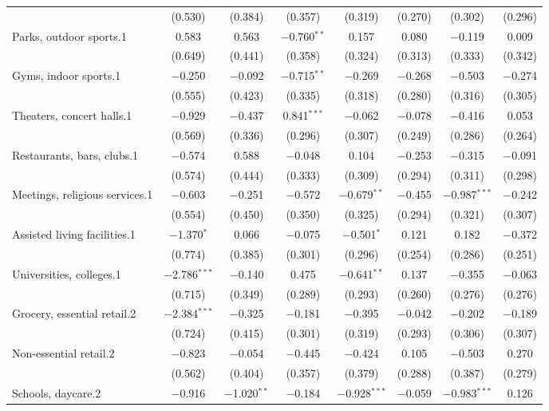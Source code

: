 \begin{table}[!htbp]
\begin{tabular}{@{\extracolsep{5pt}}lccccccc}
  & (0.530) & (0.384) & (0.357) & (0.319) & (0.270) & (0.302) & (0.296) \\ 
  Parks, outdoor sports.1 & 0.583 & 0.563 & $-$0.760$^{**}$ & 0.157 & 0.080 & $-$0.119 & 0.009 \\ 
  & (0.649) & (0.441) & (0.358) & (0.324) & (0.313) & (0.333) & (0.342) \\ 
  Gyms, indoor sports.1 & $-$0.250 & $-$0.092 & $-$0.715$^{**}$ & $-$0.269 & $-$0.268 & $-$0.503 & $-$0.274 \\ 
  & (0.555) & (0.423) & (0.335) & (0.318) & (0.280) & (0.316) & (0.305) \\ 
  Theaters, concert halls.1 & $-$0.929 & $-$0.437 & 0.841$^{***}$ & $-$0.062 & $-$0.078 & $-$0.416 & 0.053 \\ 
  & (0.569) & (0.336) & (0.296) & (0.307) & (0.249) & (0.286) & (0.264) \\ 
  Restaurants, bars, clubs.1 & $-$0.574 & 0.588 & $-$0.048 & 0.104 & $-$0.253 & $-$0.315 & $-$0.091 \\ 
  & (0.574) & (0.444) & (0.333) & (0.309) & (0.294) & (0.311) & (0.298) \\ 
  Meetings, religious services.1 & $-$0.603 & $-$0.251 & $-$0.572 & $-$0.679$^{**}$ & $-$0.455 & $-$0.987$^{***}$ & $-$0.242 \\ 
  & (0.554) & (0.450) & (0.350) & (0.325) & (0.294) & (0.321) & (0.307) \\ 
  Assisted living facilities.1 & $-$1.370$^{*}$ & 0.066 & $-$0.075 & $-$0.501$^{*}$ & 0.121 & 0.182 & $-$0.372 \\ 
  & (0.774) & (0.385) & (0.301) & (0.296) & (0.254) & (0.286) & (0.251) \\ 
  Universities, colleges.1 & $-$2.786$^{***}$ & $-$0.140 & 0.475 & $-$0.641$^{**}$ & 0.137 & $-$0.355 & $-$0.063 \\ 
  & (0.715) & (0.349) & (0.289) & (0.293) & (0.260) & (0.276) & (0.276) \\ 
  Grocery, essential retail.2 & $-$2.384$^{***}$ & $-$0.325 & $-$0.181 & $-$0.395 & $-$0.042 & $-$0.202 & $-$0.189 \\ 
  & (0.724) & (0.415) & (0.301) & (0.319) & (0.293) & (0.306) & (0.307) \\ 
  Non-essential retail.2 & $-$0.823 & $-$0.054 & $-$0.445 & $-$0.424 & 0.105 & $-$0.503 & 0.270 \\ 
  & (0.562) & (0.404) & (0.357) & (0.379) & (0.288) & (0.387) & (0.279) \\ 
  Schools, daycare.2 & $-$0.916 & $-$1.020$^{**}$ & $-$0.184 & $-$0.928$^{***}$ & $-$0.059 & $-$0.983$^{***}$ & 0.126 \\ 

\end{tabular}
\end{table}
